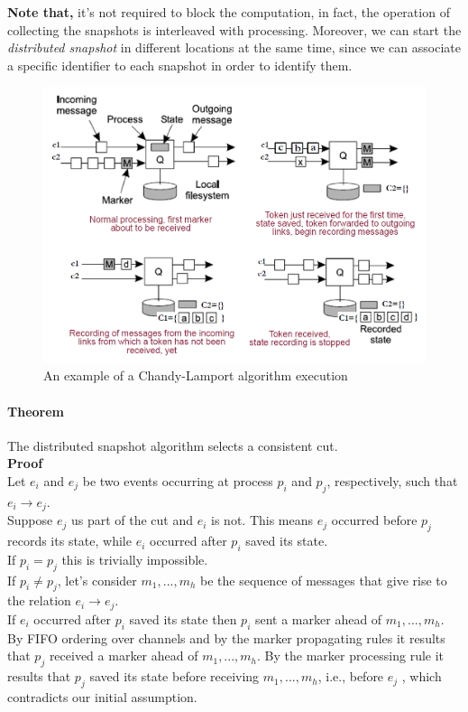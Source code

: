 \textbf{Note that,} it's not required to block the computation, in fact, the operation of collecting the snapshots is interleaved with processing. Moreover, we can start the \textit{distributed snapshot} in different locations at the same time, since we can associate a specific identifier to each snapshot in order to identify them.

\begin{figure}[h]
    \caption{An example of a Chandy-Lamport algorithm execution}
    \includegraphics[scale=0.4]{src/images/synchronization/distributed-snapshot.png}
    \centering
\end{figure}

\paragraph{Theorem}
The distributed snapshot algorithm selects a consistent cut.\\
\textbf{Proof}\\
Let $e_i$ and $e_j$ be two events occurring at process $p_i$ and $p_j$, respectively, such that $e_i \to e_j$.\\
Suppose $e_j$ us part of the cut and $e_i$ is not. This means $e_j$ occurred before $p_j$ records its state, while $e_i$ occurred after $p_i$ saved its state.\\
If $p_i = p_j$ this is trivially impossible.\\
If $p_i \neq p_j$, let's consider $m_1, ..., m_h$ be the sequence of messages that give rise to the relation $e_i \to e_j$.\\
If $e_i$ occurred after $p_i$ saved its state then $p_i$ sent a marker ahead of $m_1, ..., m_h$. By FIFO ordering over channels and by the marker propagating rules it results that $p_j$ received a marker ahead of $m_1,...,m_h$. By the marker processing rule it results that $p_j$ saved its state before receiving $m_1,...,m_h$, i.e., before $e_j$ , which contradicts our initial assumption.